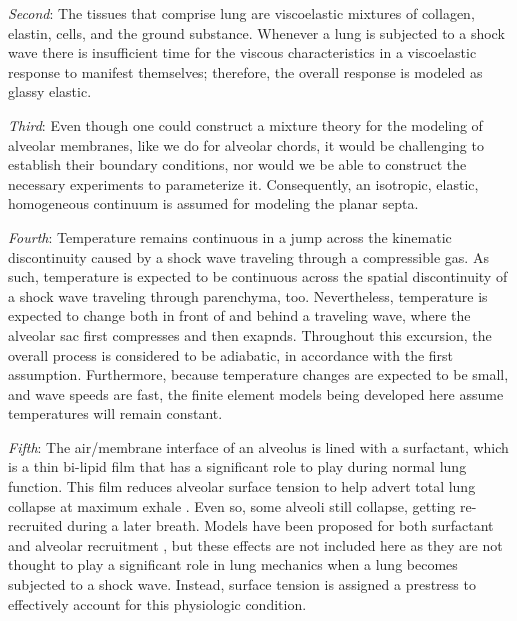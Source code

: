 \textit{Second\/}: The tissues that comprise lung are visco\-elastic \cite{Hildebrandt69,HoppinHildebrandt77} mixtures of collagen, elastin, cells, and the ground substance. \cite{RoanWaters11,Sukietal11}  Whenever a lung is subjected to a shock wave there is insufficient time for the viscous characteristics in a visco\-elastic response to manifest themselves; therefore, the overall response is modeled as glassy elastic.  

\textit{Third\/}: Even though one could construct a mixture theory for the modeling of alveolar membranes, like we do for alveolar chords, it would be challenging to establish their boundary conditions, nor would we be able to construct the necessary experiments to parameterize it.  Consequently, an isotropic, elastic, homogeneous continuum is assumed for modeling the planar septa.

\textit{Fourth\/}: Temperature remains continuous in a jump across the kinematic discontinuity caused by a shock wave traveling through a compressible gas. \cite{AmesStaff53} As such, temperature is expected to be continuous across the spatial discontinuity of a shock wave traveling through parenchyma, too.  Nevertheless, temperature is expected to change both in front of and behind a traveling wave, where the alveolar sac first compresses and then exapnds.  Throughout this excursion, the overall process is considered to be adiabatic, in accordance with the first assumption.  Furthermore, because temperature changes are expected to be small, and wave speeds are fast, the finite element models being developed here assume temperatures will remain constant.

\textit{Fifth\/}: The air\slash membrane interface of an alveolus is lined with a surfactant, which is a thin bi-lipid film that has a significant role to play during normal lung function.  This film reduces alveolar surface tension to help advert total lung collapse at maximum exhale \cite{Stamenovic90}.  Even so, some alveoli still collapse, getting re-recruited during a later breath.  Models have been proposed for both surfactant \cite{Hills99} and alveolar recruitment \cite{Bates07}, but these effects are not included here as they are not thought to play a significant role in lung mechanics when a lung becomes subjected to a shock wave.  Instead, surface tension is assigned a prestress to effectively account for this physiologic condition.

